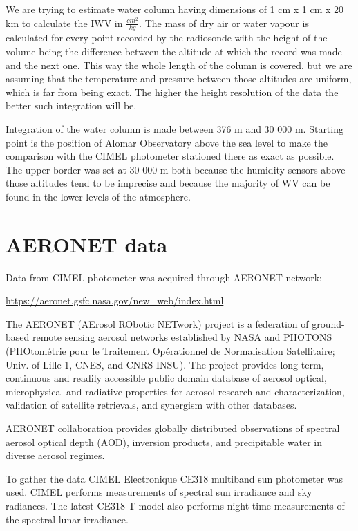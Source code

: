 \documentclass[]{book}
\begin{document}
	We are trying to estimate water column having dimensions of 1 cm x 1 cm x 20 km to calculate the IWV in $ \frac{cm^2}{kg}$. The mass of dry air or water vapour is calculated for every point recorded by the radiosonde with the height of the volume being the difference between the altitude at which the record was made and the next one. This way the whole length of the column is covered, but we are assuming that the temperature and pressure between those altitudes are uniform, which is far from being exact. The higher the height resolution of the data the better such integration will be.
	
	Integration of the water column is made between 376 m and 30 000 m. Starting point is the position of Alomar Observatory above the sea level to make the comparison with the CIMEL photometer stationed there as exact as possible. The upper border was set at 30 000 m both because the humidity sensors above those altitudes tend to be imprecise and because the majority of WV can be found in the lower levels of the atmosphere.
	
	\section{AERONET data}
	
	Data from CIMEL photometer was acquired through AERONET network:
	
	\url{https://aeronet.gsfc.nasa.gov/new\_web/index.html}
	
	The AERONET (AErosol RObotic NETwork) project is a federation of ground-based remote sensing aerosol networks established by NASA and PHOTONS (PHOtométrie pour le Traitement Opérationnel de Normalisation Satellitaire; Univ. of Lille 1, CNES, and CNRS-INSU). The project provides long-term, continuous and readily accessible public domain database of aerosol optical, microphysical and radiative properties for aerosol research and characterization, validation of satellite retrievals, and synergism with other databases.
	
	AERONET collaboration provides globally distributed observations of spectral aerosol optical depth (AOD), inversion products, and precipitable water in diverse aerosol regimes.
	
	To gather the data CIMEL Electronique CE318 multiband sun photometer was used. CIMEL performs measurements of spectral sun irradiance and sky radiances. The latest CE318-T model also performs night time measurements of the spectral lunar irradiance.
	
\end{document}
